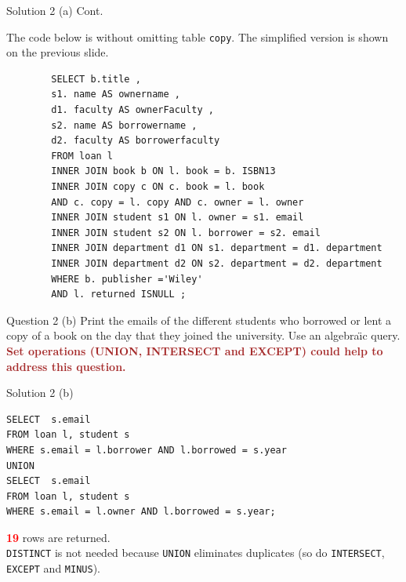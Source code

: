 \begin{frame}[fragile]{Solution 2 (a) Cont.}
	
	The code below is without omitting table \texttt{copy}. The simplified version is shown on the previous slide.	
	
	\begin{lstlisting}
		SELECT b.title ,
		s1. name AS ownername ,
		d1. faculty AS ownerFaculty ,
		s2. name AS borrowername ,
		d2. faculty AS borrowerfaculty
		FROM loan l
		INNER JOIN book b ON l. book = b. ISBN13
		INNER JOIN copy c ON c. book = l. book
		AND c. copy = l. copy AND c. owner = l. owner
		INNER JOIN student s1 ON l. owner = s1. email
		INNER JOIN student s2 ON l. borrower = s2. email
		INNER JOIN department d1 ON s1. department = d1. department
		INNER JOIN department d2 ON s2. department = d2. department
		WHERE b. publisher ='Wiley'
		AND l. returned ISNULL ;
	\end{lstlisting} 
	
\end{frame}
	
\begin{frame}[fragile]{Question 2 (b)}
Print the emails of the different students who borrowed or lent a copy of a book on the day that they joined the university. Use an algebra\"{\i}c query.\\
\vspace{10pt}
\textcolor{brown}{\textbf{Set operations (UNION, INTERSECT and EXCEPT) could help to address this question.}}
\end{frame}

\begin{frame}[fragile]{Solution 2 (b)}

\begin{lstlisting}
SELECT  s.email 
FROM loan l, student s 
WHERE s.email = l.borrower AND l.borrowed = s.year
UNION
SELECT  s.email 
FROM loan l, student s 
WHERE s.email = l.owner AND l.borrowed = s.year;
\end{lstlisting}

\textcolor{red}{\textbf{19}} rows are returned.\\
\vspace{5pt}
\texttt{DISTINCT} is not needed because \texttt{UNION}  eliminates duplicates (so do \texttt{INTERSECT}, \texttt{EXCEPT} and \texttt{MINUS}). 

\end{frame}

